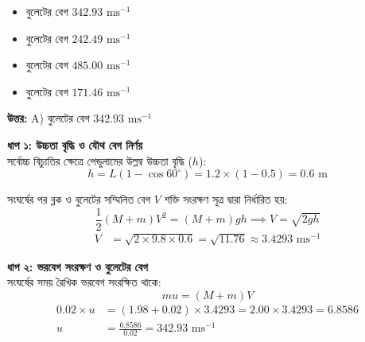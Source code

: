 \documentclass[12pt, a4paper]{article}
\begin{document}
\begin{itemize}[label={}, leftmargin=1cm, itemsep=0.5em]
    \item[\textbf{A)}] বুলেটের বেগ $342.93\text{ ms}^{-1}$
    \item[\textbf{B)}] বুলেটের বেগ $242.49\text{ ms}^{-1}$
    \item[\textbf{C)}] বুলেটের বেগ $485.00\text{ ms}^{-1}$
    \item[\textbf{D)}] বুলেটের বেগ $171.46\text{ ms}^{-1}$
\end{itemize}

\vspace{0.5em}
\begin{tcolorbox}[answerbox]
    \textbf{\color{success} উত্তর:} A) বুলেটের বেগ $342.93\text{ ms}^{-1}$
\end{tcolorbox}
\vspace{1em}

\begin{tcolorbox}[solutionbox={সমাধান (Solution)}]
    \noindent
    \textbf{ধাপ ১: উচ্চতা বৃদ্ধি ও যৌথ বেগ নির্ণয়} \\
    সর্বোচ্চ বিচ্যুতির ক্ষেত্রে পেন্ডুলামের উল্লম্ব উচ্চতা বৃদ্ধি ($h$):
    \[ h = L (1 - \cos 60^\circ) = 1.2 \times (1 - 0.5) = 0.6\text{ m} \]
    
    সংঘর্ষের পর ব্লক ও বুলেটের সম্মিলিত বেগ $V$ শক্তি সংরক্ষণ সূত্র দ্বারা নির্ধারিত হয়:
    \[ \frac{1}{2} (M + m) V^2 = (M + m) g h \implies V = \sqrt{2gh} \]
    \begin{align*}
        V &= \sqrt{2 \times 9.8 \times 0.6} = \sqrt{11.76} \approx 3.4293\text{ ms}^{-1}
    \end{align*}
    
    \vspace{0.5em}
    \noindent\textbf{ধাপ ২: ভরবেগ সংরক্ষণ ও বুলেটের বেগ} \\
    সংঘর্ষের সময় রৈখিক ভরবেগ সংরক্ষিত থাকে:
    \[ m u = (M + m) V \]
    \begin{align*}
        0.02 \times u &= (1.98 + 0.02) \times 3.4293 = 2.00 \times 3.4293 = 6.8586 \\
        u &= \frac{6.8586}{0.02} = \mathbf{342.93}\text{ ms}^{-1}
    \end{align*}
\end{tcolorbox}
\end{document}
